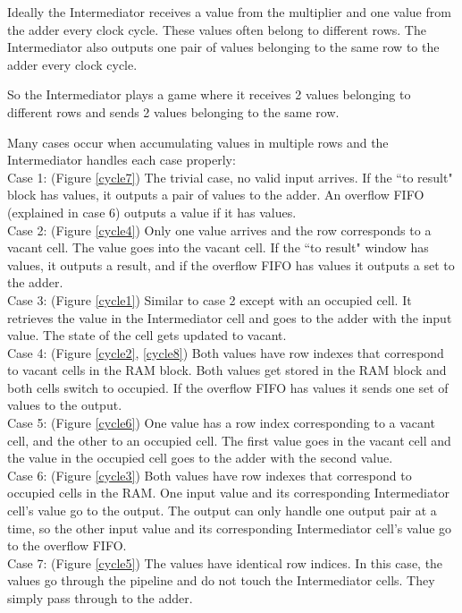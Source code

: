 Ideally the Intermediator receives a value from the multiplier and one value from the adder every clock cycle. These values often belong to different rows. The Intermediator also outputs one pair of values belonging to the same row to the adder every clock cycle.

\par So the Intermediator plays a game where it receives 2 values belonging to different rows and sends 2 values belonging to the same row.

\par Many cases occur when accumulating values in multiple rows and the Intermediator handles each case properly:
\\\indent Case 1: (Figure \ref{cycle7}) The trivial case, no valid input arrives. If the ``to result" block has values, it outputs a pair of values to the adder. An overflow FIFO (explained in case 6) outputs a value if it has values.
\\\indent Case 2: (Figure \ref{cycle4}) Only one value arrives and the row corresponds to a vacant cell. The value goes into the vacant cell. If the ``to result" window has values, it outputs a result, and if the overflow FIFO has values it outputs a set to the adder.
\\\indent Case 3: (Figure \ref{cycle1}) Similar to case 2 except with an occupied cell. It retrieves the value in the Intermediator cell and goes to the adder with the input value. The state of the cell gets updated to vacant.
\\\indent Case 4: (Figure \ref{cycle2}, \ref{cycle8}) Both values have row indexes that correspond to vacant cells in the RAM block. Both values get stored in the RAM block and both cells switch to occupied. If the overflow FIFO has values it sends one set of values to the output. 
\\\indent Case 5: (Figure \ref{cycle6}) One value has a row index corresponding to a vacant cell, and the other to an occupied cell. The first value goes in the vacant cell and the value in the occupied cell goes to the adder with the second value. 
\\\indent Case 6: (Figure \ref{cycle3}) Both values have row indexes that correspond to occupied cells in the RAM. One input value and its corresponding Intermediator cell's value go to the output. The output can only handle one output pair at a time, so the other input value and its corresponding Intermediator cell's value go to the overflow FIFO.
\\\indent Case 7: (Figure \ref{cycle5}) The values have identical row indices. In this case, the values go through the pipeline and do not touch the Intermediator cells. They simply pass through to the adder.\\
